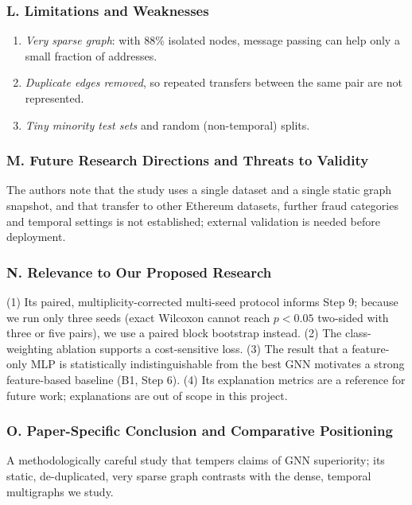 \documentclass[11pt,a4paper]{article}
\begin{document}
\subsubsection*{L. Limitations and Weaknesses}
\begin{enumerate}[leftmargin=*]
    \item \textit{Very sparse graph}: with 88\% isolated nodes, message passing can help only a small fraction of addresses.
    \item \textit{Duplicate edges removed}, so repeated transfers between the same pair are not represented.
    \item \textit{Tiny minority test sets} and random (non-temporal) splits.
\end{enumerate}

\subsubsection*{M. Future Research Directions and Threats to Validity}
The authors note that the study uses a single dataset and a single static graph snapshot, and that transfer to other Ethereum datasets, further fraud categories and temporal settings is not established; external validation is needed before deployment.

\subsubsection*{N. Relevance to Our Proposed Research}
(1) Its paired, multiplicity-corrected multi-seed protocol informs Step 9; because we run only three seeds (exact Wilcoxon cannot reach $p<0.05$ two-sided with three or five pairs), we use a paired block bootstrap instead. (2) The class-weighting ablation supports a cost-sensitive loss. (3) The result that a feature-only MLP is statistically indistinguishable from the best GNN motivates a strong feature-based baseline (B1, Step 6). (4) Its explanation metrics are a reference for future work; explanations are out of scope in this project.

\subsubsection*{O. Paper-Specific Conclusion and Comparative Positioning}
A methodologically careful study that tempers claims of GNN superiority; its static, de-duplicated, very sparse graph contrasts with the dense, temporal multigraphs we study.

\end{document}
